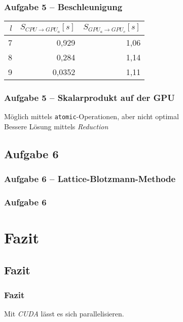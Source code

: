 \documentclass[german,notes,18pt]{beamer}
\begin{document}
	\begin{frame}
		\frametitle{Aufgabe 5 -- Beschleunigung}
		\begin{center}
			\begin{tabular}{r|r|r}
			$l$ & $S_{CPU\rightarrow GPU_a}[s]$ & $S_{GPU_a\rightarrow GPU_c}[s]$ \\
			\hline
			7 & 0,929 & 1,06 \\
			8 & 0,284 & 1,14 \\
			9 & 0,0352 & 1,11
		\end{tabular}
		\end{center}
	\end{frame}
	\begin{frame}
		\frametitle{Aufgabe 5 -- Skalarprodukt auf der GPU}
		Möglich mittels \texttt{atomic}-Operationen, aber nicht optimal \\
		\vspace{2em}
		Bessere Lösung mittels \emph{Reduction}
	\end{frame}

	\subsection{Aufgabe 6}
	\begin{frame}
		\frametitle{Aufgabe 6 -- Lattice-Blotzmann-Methode}
		
	\end{frame}
	\begin{frame}
		\frametitle{Aufgabe 6}
		
	\end{frame}

	
	\section{Fazit}
	\subsection{Fazit}
	\begin{frame}
		\frametitle{Fazit}
		
		\LARGE
		\centering
		Mit \emph{CUDA} lässt es sich parallelisieren.
	\end{frame}
\end{document}
